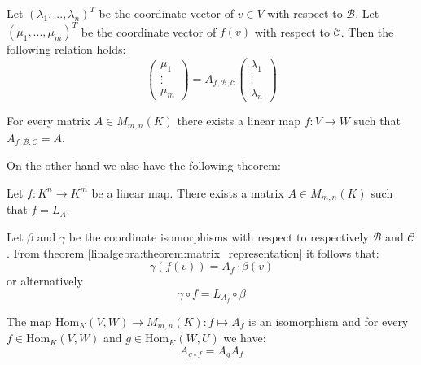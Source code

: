         \begin{theorem}\label{linalgebra:theorem:matrix_representation}
		Let $(\lambda_1, ..., \lambda_n)^T$ be the coordinate vector of $v\in V$ with respect to $\mathcal{B}$. Let $(\mu_1, ..., \mu_m)^T$ be the coordinate vector of $f(v)$ with respect to $\mathcal{C}$. Then the following relation holds:
            	\begin{equation}
			\left(
			\begin{array}{c}
				\mu_1\\
				\vdots\\
				\mu_m
			\end{array}\right)
	                = A_{f, \mathcal{B}, \mathcal{C}}
        	        \left(\begin{array}{c}
				\lambda_1\\
				\vdots\\
				\lambda_n
			\end{array}\right)
		\end{equation}
	\end{theorem}
        
        \begin{theorem}\label{linalgebra:theorem:map_matrix_link}
		For every matrix $A\in M_{m,n}(K)$ there exists a linear map $f:V\rightarrow W$ such that $A_{f, \mathcal{B}, \mathcal{C}} = A$.
	\end{theorem}
        On the other hand we also have the following theorem:
        \begin{theorem}
		Let $f:K^n\rightarrow K^m$ be a linear map. There exists a matrix $A\in M_{m,n}(K)$ such that $f=L_A$.
	\end{theorem}
        \begin{theorem}
		Let $\beta$ and $\gamma$ be the coordinate isomorphisms with respect to respectively $\mathcal{B}$ and $\mathcal{C}$. From theorem \ref{linalgebra:theorem:matrix_representation} it follows that:
        	\begin{equation}
			\gamma(f(v)) = A_f\cdot\beta(v)
		\end{equation}
        	or alternatively
        	\begin{equation}
			\gamma\circ f = L_{A_f}\circ\beta
		\end{equation}
	\end{theorem}
        
        \begin{theorem}\label{linalgebra:theorem:matrix_composition_hom}
	        The map $\text{Hom}_K(V,W)\rightarrow M_{m,n}(K):f\mapsto A_f$ is an isomorphism and for every $f\in\text{Hom}_K(V,W)$ and $g\in \text{Hom}_K(W,U)$ we have:
		\begin{equation}
			A_{g\circ f} = A_gA_f
		\end{equation}
	\end{theorem}
	
